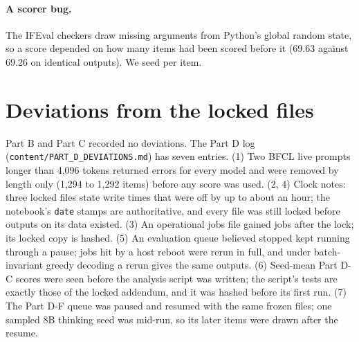\documentclass[11pt]{article}
\begin{document}
\paragraph{A scorer bug.} The IFEval checkers draw missing arguments from Python's global random state, so a score
depended on how many items had been scored before it (69.63 against 69.26 on identical outputs). We seed per item.

\section{Deviations from the locked files}
\label{app:deviations}
Part B and Part C recorded no deviations. The Part D log (\texttt{content/PART\_D\_DEVIATIONS.md}) has seven entries.
(1) Two BFCL live prompts longer than 4,096 tokens returned errors for every model and were removed by length only
(1,294 to 1,292 items) before any score was used. (2, 4) Clock notes: three locked files state write times that were
off by up to about an hour; the notebook's \texttt{date} stamps are authoritative, and every file was still locked before
outputs on its data existed. (3) An operational jobs file gained jobs after the lock; its locked copy is hashed. (5)
An evaluation queue believed stopped kept running through a pause; jobs hit by a host reboot were rerun in full, and
under batch-invariant greedy decoding a rerun gives the same outputs. (6) Seed-mean Part D-C scores were seen before
the analysis script was written; the script's tests are exactly those of the locked addendum, and it was hashed
before its first run. (7) The Part D-F queue was paused and resumed with the same frozen files; one sampled 8B
thinking seed was mid-run, so its later items were drawn after the resume.
\end{document}
